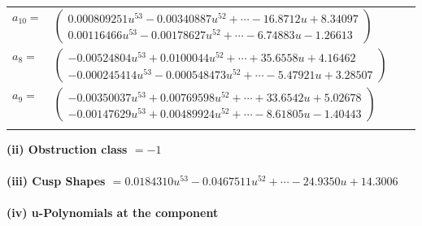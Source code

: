 \documentclass[1p]{elsarticle_modified}
\theoremstyle{definition}
\begin{document}
\begin{tabular}{m{7pt} m{180pt} m{7pt} m{180pt} }
\flushright $a_{10}=$&$\begin{pmatrix}0.000809251 u^{53}-0.00340887 u^{52}+\cdots-16.8712 u+8.34097\\0.00116466 u^{53}-0.00178627 u^{52}+\cdots-6.74883 u-1.26613\end{pmatrix}$ \\
\flushright $a_{8}=$&$\begin{pmatrix}-0.00524804 u^{53}+0.0100044 u^{52}+\cdots+35.6558 u+4.16462\\-0.000245414 u^{53}-0.000548473 u^{52}+\cdots-5.47921 u+3.28507\end{pmatrix}$ \\
\flushright $a_{9}=$&$\begin{pmatrix}-0.00350037 u^{53}+0.00769598 u^{52}+\cdots+33.6542 u+5.02678\\-0.00147629 u^{53}+0.00489924 u^{52}+\cdots-8.61805 u-1.40443\end{pmatrix}$\\&\end{tabular}
\flushleft \textbf{(ii) Obstruction class $= -1$}\\~\\
\flushleft \textbf{(iii) Cusp Shapes $= 0.0184310 u^{53}-0.0467511 u^{52}+\cdots-24.9350 u+14.3006$}\\~\\
\newpage\renewcommand{\arraystretch}{1}
\flushleft \textbf{(iv) u-Polynomials at the component}\newline \\
\end{document}
